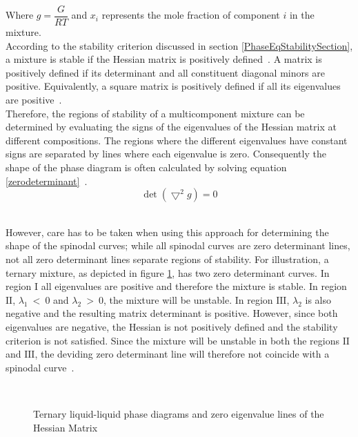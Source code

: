 Where $g = \dfrac{G}{RT}$ and $x_{i}$ represents the mole fraction of component $i$ in the mixture.\\

According to the stability criterion discussed in section \ref{PhaseEqStabilitySection}, a mixture is stable if the Hessian matrix is positively defined~\cite{HessianPhaseEquilibriumCriterion}. A matrix is positively defined if its determinant and all constituent diagonal minors are positive. Equivalently, a square matrix is positively defined if all its eigenvalues are positive~\cite{NumericalAnalysis, HessianPhaseEquilibriumCriterion}.\\

Therefore, the regions of stability of a multicomponent mixture can be determined by evaluating the signs of the eigenvalues of the Hessian matrix at different compositions. The regions where the different eigenvalues have constant signs are separated by lines where each eigenvalue is zero. Consequently the shape of the phase diagram is often calculated by solving equation \ref{zerodeterminant}~\cite{HessianPhaseEquilibriumCriterion}.\\

\begin{equation}
\det \left(\bigtriangledown^{2} g\right) = 0 \label{zerodeterminant}
\end{equation}\

However, care has to be taken when using this approach for determining the shape of the spinodal curves; while all spinodal curves are zero determinant lines, not all zero determinant lines separate regions of stability. For illustration, a ternary mixture, as depicted in figure \ref{ZeroEigenvalueLinesDrawing}, has two zero determinant curves. In region $\mathrm{I}$ all eigenvalues are positive and therefore the mixture is stable. In region $\mathrm{II}$, $\lambda_{1}~<~0$ and $\lambda_{2}~>~0$, the mixture will be unstable. In region $\mathrm{III}$, $\lambda_{2}$ is also negative and the resulting matrix determinant is positive. However, since both eigenvalues are negative, the Hessian is not positively defined and the stability criterion is not satisfied. Since the mixture will be unstable in both the regions $\mathrm{II}$ and $\mathrm{III}$, the deviding zero determinant line will therefore not coincide with a spinodal curve~\cite{HessianPhaseEquilibriumCriterion}.\\

\begin{figure}[t]
\begin{center}
\resizebox{0.7\textwidth}{!}{}\\
\end{center}
\caption{Ternary liquid-liquid phase diagrams and zero eigenvalue lines of the Hessian Matrix} \label{ZeroEigenvalueLinesDrawing}
\end{figure}	

